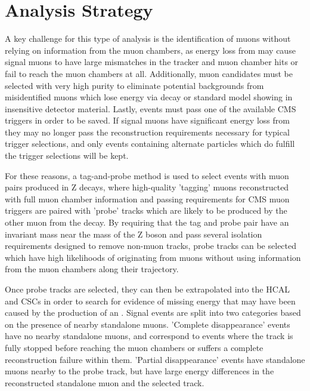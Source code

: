 \chapter{Analysis Strategy}
\label{analysis}
A key challenge for this type of analysis is the identification of muons without relying on information from the muon chambers, as energy loss from \dbrem may cause signal muons to have large mismatches in the tracker and muon chamber hits or fail to reach the muon chambers at all.
Additionally, muon candidates must be selected with very high purity to eliminate potential backgrounds from misidentified muons which lose energy via decay or standard model showing in insensitive detector material.
Lastly, events must pass one of the available CMS triggers in order to be saved.
If signal muons have significant energy loss from \dbrem they may no longer pass the reconstruction requirements necessary for typical trigger selections, and only events containing alternate particles which do fulfill the trigger selections will be kept.

For these reasons, a tag-and-probe method is used to select events with muon pairs produced in Z decays, where high-quality 'tagging' muons reconstructed with full muon chamber information and passing requirements for CMS muon triggers are paired with 'probe' tracks which are likely to be produced by the other muon from the decay.
By requiring that the tag and probe pair have an invariant mass near the mass of the Z boson and pass several isolation requirements designed to remove non-muon tracks, probe tracks can be selected which have high likelihoods of originating from muons without using information from the muon chambers along their trajectory.

Once probe tracks are selected, they can then be extrapolated into the HCAL and CSCs in order to search for evidence of missing energy that may have been caused by the production of an \aprime.
Signal events are split into two categories based on the presence of nearby standalone muons.
'Complete disappearance' events have no nearby standalone muons, and correspond to events where the track is fully stopped before reaching the muon chambers or suffers a complete reconstruction failure within them.
'Partial disappearance' events have standalone muons nearby to the probe track, but have large energy differences in the reconstructed standalone muon and the selected track.

